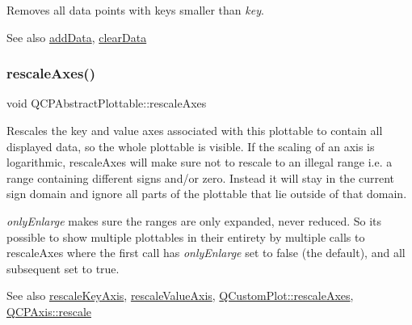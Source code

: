 Removes all data points with keys smaller than {\itshape key}. \begin{DoxySeeAlso}{See also}
\mbox{\hyperlink{class_q_c_p_graph_aa5c6181d84db72ce4dbe9dc15a34ef4f}{add\+Data}}, \mbox{\hyperlink{class_q_c_p_graph_ad4e94a4e44e5e76fbec81a72a977157d}{clear\+Data}} 
\end{DoxySeeAlso}
\mbox{\label{class_q_c_p_graph_a1491c4a606bccd2d09e65e11b79eb882}} 
\subsubsection{\texorpdfstring{rescale\+Axes()}{rescaleAxes()}\hspace{0.1cm}{\footnotesize\ttfamily [1/2]}}
{\footnotesize\ttfamily void Q\+C\+P\+Abstract\+Plottable\+::rescale\+Axes}

Rescales the key and value axes associated with this plottable to contain all displayed data, so the whole plottable is visible. If the scaling of an axis is logarithmic, rescale\+Axes will make sure not to rescale to an illegal range i.\+e. a range containing different signs and/or zero. Instead it will stay in the current sign domain and ignore all parts of the plottable that lie outside of that domain.

{\itshape only\+Enlarge} makes sure the ranges are only expanded, never reduced. So it\textquotesingle{}s possible to show multiple plottables in their entirety by multiple calls to rescale\+Axes where the first call has {\itshape only\+Enlarge} set to false (the default), and all subsequent set to true.

\begin{DoxySeeAlso}{See also}
\mbox{\hyperlink{class_q_c_p_graph_a051fb77b459ba1ae8d65552c67f45e94}{rescale\+Key\+Axis}}, \mbox{\hyperlink{class_q_c_p_graph_a9e0e620a56932c4df80a3762c2f93608}{rescale\+Value\+Axis}}, \mbox{\hyperlink{class_q_custom_plot_ad86528f2cee6c7e446dea4a6e8839935}{Q\+Custom\+Plot\+::rescale\+Axes}}, \mbox{\hyperlink{class_q_c_p_axis_a499345f02ebce4b23d8ccec96e58daa9}{Q\+C\+P\+Axis\+::rescale}} 
\end{DoxySeeAlso}
\mbox{\label{class_q_c_p_graph_a9c3909d6116e9d03978f057d41174e6a}} 
